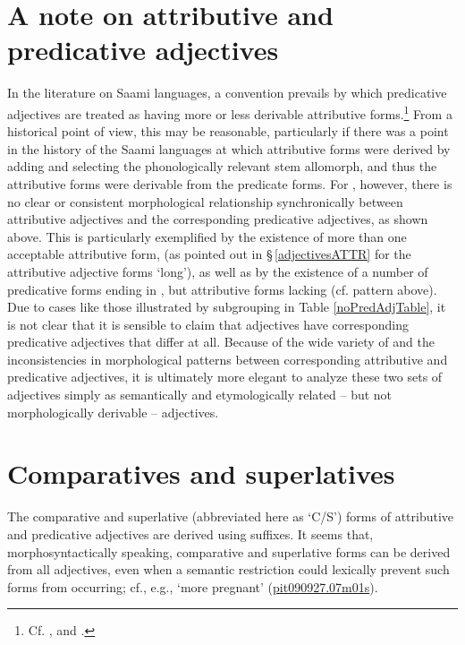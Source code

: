 \section{A note on attributive and predicative adjectives}\label{notePredNounsAdjs}
In the literature on Saami languages, a convention prevails by which predicative adjectives are treated as having more or less derivable attributive forms.\footnote{Cf. \citet[71]{Sammallahti1998}, \citet[74-76;98]{Svonni2009} and \citet[179]{Feist2010}.} 
From a historical point of view, this may be reasonable, particularly if there was a point in the history of the Saami languages at which attributive forms were derived by adding \mbox{} and selecting the phonologically relevant stem allomorph, and thus the attributive forms were derivable from the predicate forms. For \PS, however, there is no clear or consistent morphological relationship synchronically between attributive adjectives and the corresponding predicative adjectives, as shown above. This is particularly exemplified by the existence of more than one acceptable attributive form, (as pointed out in §\,\ref{adjectivesATTR} for the attributive adjective forms \TILDE{} ‘long’), as well as by the existence of a number of predicative forms ending in , but attributive forms lacking  (cf. pattern  above). 
Due to cases like those illustrated by subgrouping  in Table \ref{noPredAdjTable}, it is not clear that it is sensible to claim that  adjectives have corresponding predicative adjectives that differ at all. 
Because of the wide variety of and the inconsistencies in morphological patterns between corresponding attributive and predicative adjectives, it is ultimately more elegant to analyze these two sets of adjectives simply as semantically and etymologically related – but not morphologically derivable – adjectives. 


\section{Comparatives and superlatives}\label{compSuperlADJs}
The comparative and superlative (abbreviated here as ‘C/S’) forms of attributive and predicative adjectives are derived using suffixes. It seems that, morphosyntactically speaking, comparative and superlative forms can be derived from all adjectives, even when a semantic restriction could lexically prevent such forms from occurring; cf., e.g.,  ‘more pregnant’ (\hyperlink{pit090927}{pit090927.07m01s}). 

